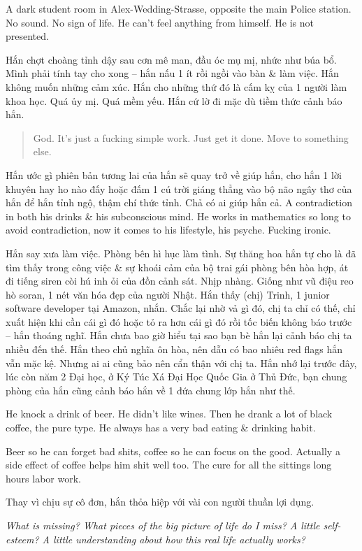 \documentclass[12pt]{article}
\begin{document}
A dark student room in Alex-Wedding-Strasse, opposite the main Police station. No sound. No sign of life. He can't feel anything from himself. He is not presented.

Hắn chợt choàng tỉnh dậy sau cơn mê man, đầu óc mụ mị, nhức như búa bổ. Mình phải tính tay cho xong -- hắn nấu 1 ít rồi ngồi vào bàn \& làm việc. Hắn không muốn những cảm xúc. Hắn cho những thứ đó là cấm kỵ của 1 người làm khoa học. Quá ủy mị. Quá mềm yếu. Hắn cứ lờ đi mặc dù tiềm thức cảnh báo hắn.

\begin{quote}
	God. It's just a fucking simple work. Just get it done. Move to something else.
\end{quote}
Hắn ước gì phiên bản tương lai của hắn sẽ quay trở về giúp hắn, cho hắn 1 lời khuyên hay ho nào đấy hoặc đấm 1 cú trời giáng thẳng vào bộ não ngây thơ của hắn để hắn tỉnh ngộ, thậm chí thức tỉnh. Chả có ai giúp hắn cả. A contradiction in both his drinks \& his subconscious mind. He works in mathematics so long to avoid contradiction, now it comes to his lifestyle, his psyche. Fucking ironic.

Hắn say xưa làm việc. Phòng bên hì hục làm tình. Sự thăng hoa hắn tự cho là đã tìm thấy trong công việc \& sự khoái cảm của bộ trai gái phòng bên hòa hợp, át đi tiếng siren còi hú inh ỏi của đồn cảnh sát. Nhịp nhàng. Giống như vũ điệu reo hò soran, 1 nét văn hóa đẹp của người Nhật. Hắn thấy (chị) Trinh, 1 junior software developer tại Amazon, nhắn. Chắc lại nhờ vả gì đó, chị ta chỉ có thế, chỉ xuất hiện khi cần cái gì đó hoặc tỏ ra hơn cái gì đó rồi tốc biến không báo trước -- hắn thoáng nghĩ. Hắn chưa bao giờ hiểu tại sao bạn bè hắn lại cảnh báo chị ta nhiều đến thế. Hắn theo chủ nghĩa ôn hòa, nên dẫu có bao nhiêu red flags hắn vẫn mặc kệ. Nhưng ai ai cũng bảo nên cẩn thận với chị ta. Hắn nhớ lại trước đây, lúc còn năm 2 Đại học, ở Ký Túc Xá Đại Học Quốc Gia ở Thủ Đức, bạn chung phòng của hắn cũng cảnh báo hắn về 1 đứa chung lớp hắn như thế.

He knock a drink of beer. He didn't like wines. Then he drank a lot of black coffee, the pure type. He always has a very bad eating \& drinking habit.

Beer so he can forget bad shits, coffee so he can focus on the good. Actually a side effect of coffee helps him shit well too. The cure for all the sittings long hours labor work.

Thay vì chịu sự cô đơn, hắn thỏa hiệp với vài con người thuần lợi dụng. 

{\it What is missing? What pieces of the big picture of life do I miss? A little self-esteem? A little understanding about how this real life actually works?}
\end{document}
